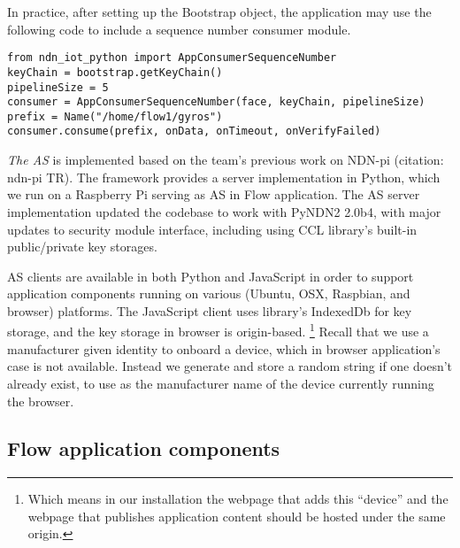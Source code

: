 In practice, after setting up the Bootstrap object, the application may use the following code to include a sequence number consumer module.

\begin{verbatim}
from ndn_iot_python import AppConsumerSequenceNumber
keyChain = bootstrap.getKeyChain()
pipelineSize = 5
consumer = AppConsumerSequenceNumber(face, keyChain, pipelineSize)
prefix = Name("/home/flow1/gyros")
consumer.consume(prefix, onData, onTimeout, onVerifyFailed)
\end{verbatim}

\emph{The AS} is implemented based on the team's previous work on NDN-pi (citation: ndn-pi TR).
The framework provides a server implementation in Python, which we run on a Raspberry Pi serving as AS in Flow application.
The AS server implementation updated the codebase to work with PyNDN2 2.0b4, with major updates to security module interface, including using CCL library's built-in public/private key storages.

AS clients are available in both Python and JavaScript in order to support application components running on various (Ubuntu, OSX, Raspbian, and browser) platforms.
The JavaScript client uses library's IndexedDb for key storage, and the key storage in browser is origin-based. \footnote{Which means in our installation the webpage that adds this ``device'' and the webpage that publishes application content should be hosted under the same origin.}
Recall that we use a manufacturer given identity to onboard a device, which in browser application's case is not available. 
Instead we generate and store a random string if one doesn't already exist, to use as the manufacturer name of the device currently running the browser.

\subsection{Flow application components}

